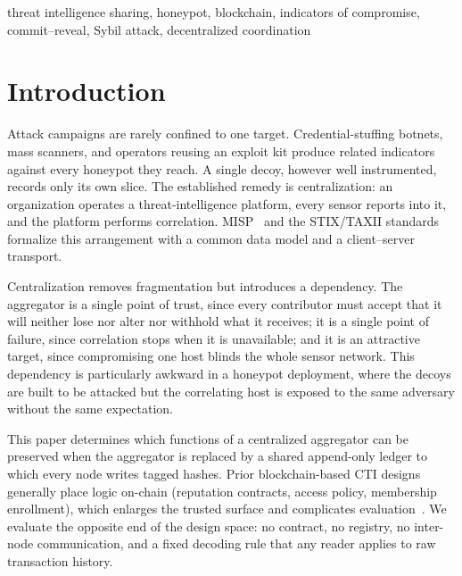 \documentclass[conference]{IEEEtran}
\begin{document}
\begin{IEEEkeywords}
threat intelligence sharing, honeypot, blockchain, indicators of compromise, commit--reveal, Sybil attack, decentralized coordination
\end{IEEEkeywords}

\section{Introduction}

Attack campaigns are rarely confined to one target. Credential-stuffing botnets, mass scanners, and operators reusing an exploit kit produce related indicators against every honeypot they reach. A single decoy, however well instrumented, records only its own slice. The established remedy is centralization: an organization operates a threat-intelligence platform, every sensor reports into it, and the platform performs correlation. MISP~\cite{ref1} and the STIX/TAXII standards~\cite{ref2,ref3} formalize this arrangement with a common data model and a client--server transport.

Centralization removes fragmentation but introduces a dependency. The aggregator is a single point of trust, since every contributor must accept that it will neither lose nor alter nor withhold what it receives; it is a single point of failure, since correlation stops when it is unavailable; and it is an attractive target, since compromising one host blinds the whole sensor network. This dependency is particularly awkward in a honeypot deployment, where the decoys are built to be attacked but the correlating host is exposed to the same adversary without the same expectation.

This paper determines which functions of a centralized aggregator can be preserved when the aggregator is replaced by a shared append-only ledger to which every node writes tagged hashes. Prior blockchain-based CTI designs generally place logic on-chain (reputation contracts, access policy, membership enrollment), which enlarges the trusted surface and complicates evaluation~\cite{ref4,ref5,ref6,ref7}. We evaluate the opposite end of the design space: no contract, no registry, no inter-node communication, and a fixed decoding rule that any reader applies to raw transaction history.
\end{document}
